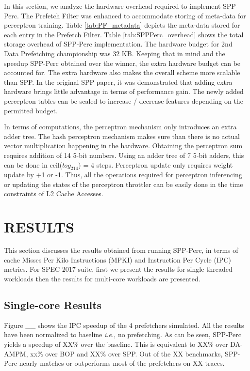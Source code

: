 \documentclass{sig-alternate}
\begin{document}

In this section, we analyze the hardware overhead required to implement SPP-Perc. 
The Prefetch Filter was enhanced to accommodate storing of meta-data for perceptron training. 
Table \ref{tab:PF_metadata} depicts the meta-data stored for each entry in the Prefetch Filter.
Table \ref{tab:SPPPerc_overhead} shows the total storage overhead of SPP-Perc implementation.
The hardware budget for 2nd Data Prefetching championship was 32 KB. 
Keeping that in mind and the speedup SPP-Perc obtained over the winner, the extra hardware budget can be accounted for.
The extra hardware also makes the overall scheme more scalable than SPP. 
In the original SPP paper, it was demonstrated that adding extra hardware brings little advantage in terms of performance gain.
The newly added perceptron tables can be scaled to increase / decrease features depending on the permitted budget.

In terms of computations, the perceptron mechanism only introduces an extra adder tree.
The hash perceptron mechanism makes sure than there is no actual vector multiplication happening in the hardware.
Obtaining the perceptron sum requires addition of 14 5-bit numbers. 
Using an adder tree of 7 5-bit adders, this can be done in ceil($log_214$) = 4 steps.
Perceptron update only requires weight update by +1 or -1.
Thus, all the operations required for perceptron inferencing or updating the states of the perceptron throttler can be easily done in the time constraints of L2 Cache Accesses.


\section{RESULTS}
This section discusses the results obtained from running SPP-Perc, in terms of cache Misses Per Kilo Instructions (MPKI) and Instruction Per Cycle (IPC) metrics. 
For SPEC 2017 suite, first we present the results for single-threaded workloads then the results for multi-core workloads are presented.

\subsection{Single-core Results}
Figure \_\_ shows the IPC speedup of the 4 prefetchers simulated. 
All the results have been normalized to baseline \textit{i.e.}, no prefetching. 
As can be seen, SPP-Perc yields a speedup of XX\% over the baseline. 
This is equivalent to XX\% over DA-AMPM, xx\% over BOP and XX\% over SPP. 
Out of the XX benchmarks, SPP-Perc nearly matches or outperforms most of the prefetchers on XX traces. 
\end{document}
